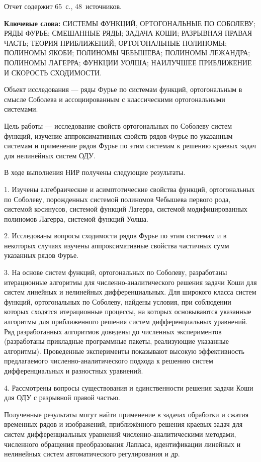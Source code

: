 \Referat %

Отчет содержит 65~с., 48~источников.

 \bigskip
 \textbf{ Ключевые
  слова:}
  СИСТЕМЫ ФУНКЦИЙ, ОРТОГОНАЛЬНЫЕ ПО СОБОЛЕВУ; РЯДЫ ФУРЬЕ; СМЕШАННЫЕ РЯДЫ; ЗАДАЧА КОШИ; РАЗРЫВНАЯ ПРАВАЯ ЧАСТЬ;
  ТЕОРИЯ ПРИБЛИЖЕНИЙ; ОРТОГОНАЛЬНЫЕ ПОЛИНОМЫ; ПОЛИНОМЫ ЯКОБИ; ПОЛИНОМЫ ЧЕБЫШЕВА; ПОЛИНОМЫ ЛЕЖАНДРА; ПОЛИНОМЫ ЛАГЕРРА; ФУНКЦИИ УОЛША; НАИЛУЧШЕЕ ПРИБЛИЖЕНИЕ И \linebreak СКОРОСТЬ СХОДИМОСТИ.

 \bigskip

Объект исследования --- ряды Фурье по системам функций, ортогональным в смысле Соболева и ассоциированным с классическими ортогональными системами.

Цель работы --- исследование свойств ортогональных по Соболеву систем функций, изучение аппроксимативных свойств рядов Фурье по указанным системам и применение рядов Фурье по этим системам к решению краевых задач для нелинейных систем ОДУ.

В ходе выполнения НИР получены следующие результаты. 

1. Изучены алгебраические и асимптотические свойства функций, ортогональных по Соболеву, порожденных системой полиномов Чебышева первого рода, системой косинусов, системой функций Лагерра, системой модифицированных полиномов Лагерра, системой функций Уолша. 

2. Исследованы вопросы сходимости рядов Фурье по этим системам и в некоторых случаях изучены аппроксимативные свойства частичных сумм указанных рядов Фурье.

3. На основе систем функций, ортогональных по Соболеву, разработаны итерационные алгоритмы для численно-аналитического решения задачи Коши для систем линейных и нелинейных дифференциальных. Для широкого класса систем функций, ортогональных по Соболеву, найдены условия, при соблюдении которых сходятся итерационные процессы, на которых основываются указанные алгоритмы для приближенного решения систем дифференциальных уравнений.
Ряд разработанных алгоритмов доведены до численных экспериментов (разработаны прикладные программные пакеты, реализующие указанные алгоритмы).
Проведенные эксперименты показывают высокую эффективность предлагаемого численно-аналитического подхода к решению систем дифференциальных и разностных уравнений.

4. Рассмотрены вопросы существования и единственности решения задачи Коши для ОДУ с разрывной правой частью.
  
Полученные результаты могут найти применение в задачах обработки и сжатия временных рядов и изображений, приближённого решения краевых задач для систем дифференциальных уравнений численно-аналитическими методами, численного обращения преобразования Лапласа, идентификации линейных и нелинейных систем автоматического регулирования и др.
